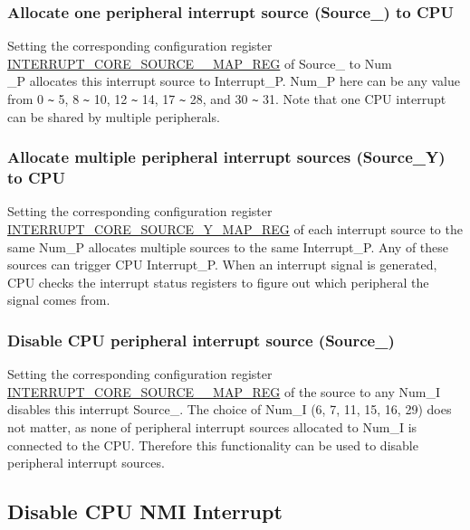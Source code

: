 \documentclass[main\_\_EN.tex]{subfiles}
\begin{document}
\subsubsection{Allocate one peripheral interrupt source (Source\_) to CPU}
Setting the corresponding configuration register \hyperref[regdesc:INTERRUPTCORE0CACHECORE1ACSINTMAPREG]{INTERRUPT\_CORE\_SOURCE\_\_MAP\_REG} of Source\_ to Num\\\_P allocates this interrupt source to Interrupt\_P. Num\_P here can be any value from 0 \verb+~+ 5, 8 \verb+~+ 10, 12 \verb+~+ 14, 17 \verb+~+ 28, and 30 \verb+~+ 31. Note that one CPU interrupt can be shared by multiple peripherals.

\subsubsection{Allocate multiple peripheral interrupt sources (Source\_Y) to CPU}
Setting the corresponding configuration register \hyperref[regdesc:INTERRUPTCORE0CACHECORE1ACSINTMAPREG]{INTERRUPT\_CORE\_SOURCE\_Y\_MAP\_REG} of each interrupt source to the same Num\_P allocates multiple sources to the same Interrupt\_P. Any of these sources can trigger CPU Interrupt\_P. When an interrupt signal is generated, CPU checks the interrupt status registers to figure out which peripheral the signal comes from.

\subsubsection{Disable CPU peripheral interrupt source (Source\_)}
Setting the corresponding configuration register \hyperref[regdesc:INTERRUPTCORE0CACHECORE1ACSINTMAPREG]{INTERRUPT\_CORE\_SOURCE\_\_MAP\_REG} of the source to any Num\_I disables this interrupt Source\_. The choice of Num\_I (6, 7, 11, 15, 16, 29) does not matter, as none of peripheral interrupt sources allocated to Num\_I is connected to the CPU. Therefore this functionality can be used to disable peripheral interrupt sources.

\subsection{Disable CPU NMI Interrupt}
\end{document}
